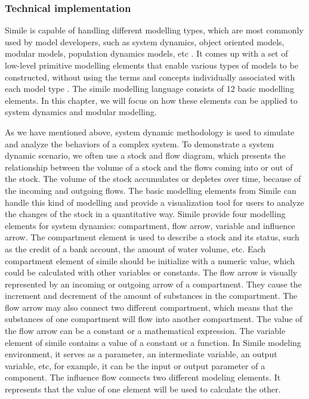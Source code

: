 \subsubsection{Technical implementation}
\par
Simile is capable of handling different modelling types, which are most commonly used by model developers, such as system dynamics, object oriented models, modular models, population dynamics models, etc \autocite{dsl:simile-simulistics}. It comes up with a set of low-level primitive modelling elements that enable various types of models to be constructed, without using the terms and concepts individually associated with each model type \autocite{dsl:simile-muetzelfeldt}. The simile modelling language consists of 12 basic modelling elements. In this chapter, we will focus on how these elements can be applied to system dynamics and modular modelling.
\par
As we have mentioned above, system dynamic methodology is used to simulate and analyze the behaviors of a complex system. To demonstrate a system dynamic scenario, we often use a stock and flow diagram, which presents the relationship between the volume of a stock and the flows coming into or out of the stock. The volume of the stock accumulates or depletes over time, because of the incoming and outgoing flows. The basic modelling elements from Simile can handle this kind of modelling and provide a visualization tool for users to analyze the changes of the stock in a quantitative way. Simile provide four modelling elements for system dynamics: compartment, flow arrow, variable and influence arrow. The compartment element is used to describe a stock and its status, such as the credit of a bank account, the amount of water volume, etc. Each compartment element of simile should be initialize with a numeric value, which could be calculated with other variables or constants. The flow arrow is visually represented by an incoming or outgoing arrow of a compartment. They cause the increment and decrement of the amount of substances in the compartment. The flow arrow may also connect two different compartment, which means that the substances of one compartment will flow into another compartment. The value of the flow arrow can be a constant or a mathematical expression. The variable element of simile contains a value of a constant or a function. In Simile modeling environment, it serves as a parameter, an intermediate variable, an output variable, etc, for example, it can be the input or output parameter of a component. The influence flow connects two different modeling elements. It represents that the value of one element will be used to calculate the other.
